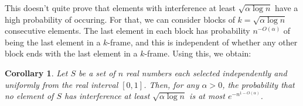 \documentclass{article}
\newtheorem{thm}{Theorem}
\newtheorem{cor}{Corollary}
\begin{document}
%
%

This doesn't quite prove that elements with interference at least
$\sqrt{\alpha\log n}$ have a high probability of occuring.  For that, we
can consider blocks of $k=\sqrt{\alpha\log n}$ consecutive elements.  The
last element in each block has probability $n^{-O(\alpha)}$ of being the
last element in a $k$-frame, and this is independent of whether any other
block ends with the last element in a $k$-frame.  Using this, we obtain:

\begin{cor}
Let $S$ be a set of $n$ real numbers each selected independently and
uniformly from the real interval $[0,1]$.  Then, for any $\alpha > 0$,
the probability that no element of $S$ has interference at
least $\sqrt{\alpha\log n}$ is at most $e^{-n^{1-O(\alpha)}}$.
\end{cor}
\end{document}
